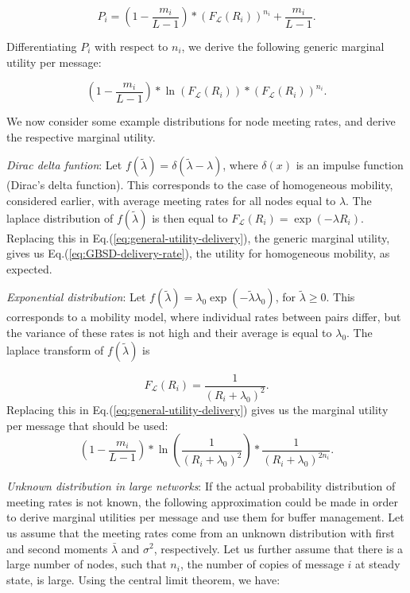 \begin{equation*}
P_{i} = (1 - \frac{m_i}{L-1})* (F_{\mathcal{L}}(R_{i}))^{n_{i}}+\frac{m_i}{L-1}.
\end{equation*}

Differentiating $P_{i}$ with respect to $n_{i}$, we derive the following generic marginal utility per message:

\begin{equation} \label{eq:general-utility-delivery}
(1 - \frac{m_i}{L-1}) * \ln(F_{\mathcal{L}}(R_{i})) * (F_{\mathcal{L}}(R_{i}))^{n_{i}}.
\end{equation}

We now consider some example distributions for node meeting rates, and derive the respective marginal utility.

\emph{Dirac delta funtion}: Let $f(\tilde{\lambda}) = \delta(\tilde{\lambda} - \lambda)$, where $\delta(x)$ is an impulse function (Dirac's delta function). This corresponds to the case of homogeneous mobility, considered earlier, with average meeting rates for all nodes equal to $\lambda$. The laplace distribution of $f(\tilde{\lambda})$ is then equal to $F_{\mathcal{L}}(R_{i}) = \exp(-\lambda R_{i})$. Replacing this in Eq.(\ref{eq:general-utility-delivery}), the generic marginal utility, gives us Eq.(\ref{eq:GBSD-delivery-rate}), the utility for homogeneous mobility, as expected.

\emph{Exponential distribution}: Let $f(\tilde{\lambda}) = \lambda_{0} \exp(-\tilde{\lambda} \lambda_{0})$, for $\tilde{\lambda} \ge 0$. This corresponds to a mobility model, where individual rates between pairs differ, but the variance of these rates is not high and their average is equal to $\lambda_0$. The laplace transform of $f(\tilde{\lambda})$ is

\begin{equation*}
F_{\mathcal{L}}(R_{i}) = \frac{1}{(R_{i} + \lambda_{0})^{2}}.
\end{equation*}
Replacing this in Eq.(\ref{eq:general-utility-delivery}) gives us the marginal utility per message that should be used:
\begin{equation}
(1 - \frac{m_i}{L-1}) * \ln(\frac{1}{(R_{i} + \lambda_{0})^{2}}) * \frac{1}{(R_{i} + \lambda_{0})^{2n_{i}}}.
\end{equation}

\emph{Unknown distribution in large networks}: If the actual probability distribution of meeting rates is not known, the following approximation could be made in order to derive marginal utilities per message and use them for buffer management. Let us assume that the meeting rates come from an unknown distribution with first and second moments $\bar{\lambda}$ and $\sigma^{2}$, respectively. Let us further assume that there is a large number of nodes, such that $n_{i}$, the number of copies of message $i$ at steady state, is large. Using the central limit theorem, we have:

